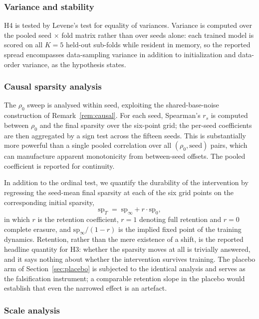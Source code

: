 \documentclass[final,5p,times,twocolumn]{elsarticle}
\theoremstyle{remark}
\newcommand{\rhoz}{\rho_{0}}
\begin{document}
\subsubsection{Variance and stability}

H4 is tested by Levene's test for equality of variances. Variance is computed
over the pooled seed $\times$ fold matrix rather than over seeds alone:
each trained model is scored on all $K = 5$ held-out sub-folds while resident in
memory, so the reported spread encompasses data-sampling variance in addition to
initialization and data-order variance, as the hypothesis states.

\subsubsection{Causal sparsity analysis}

The $\rhoz$ sweep is analysed within seed, exploiting the shared-base-noise
construction of Remark~\ref{rem:causal}. For each seed, Spearman's $r_{s}$ is
computed between $\rhoz$ and the final sparsity over the six-point grid; the
per-seed coefficients are then aggregated by a sign test across the fifteen
seeds. This is substantially more powerful than a single pooled correlation over
all $(\rhoz, \mathrm{seed})$ pairs, which can manufacture apparent monotonicity
from between-seed offsets. The pooled coefficient is reported for continuity.

In addition to the ordinal test, we quantify the durability of the
intervention by regressing the seed-mean final sparsity at each of the six
grid points on the corresponding initial sparsity,
\begin{equation}
\label{eq:retention}
\mathrm{sp}_{T} \;=\; \mathrm{sp}_{\infty} + r\cdot \mathrm{sp}_{0},
\end{equation}
in which $r$ is the retention coefficient, $r = 1$ denoting full retention and
$r = 0$ complete erasure, and
$\mathrm{sp}_{\infty}/(1-r)$ is the implied fixed point of the training
dynamics. Retention, rather than the mere existence of a shift, is the reported
headline quantity for H3: whether the sparsity moves at all is trivially
answered, and it says nothing about whether the intervention survives training.
The placebo arm of Section~\ref{sec:placebo} is subjected to the identical
analysis and serves as the falsification instrument; a comparable retention
slope in the placebo would establish that even the narrowed effect is an
artefact.

\subsubsection{Scale analysis}
\end{document}
